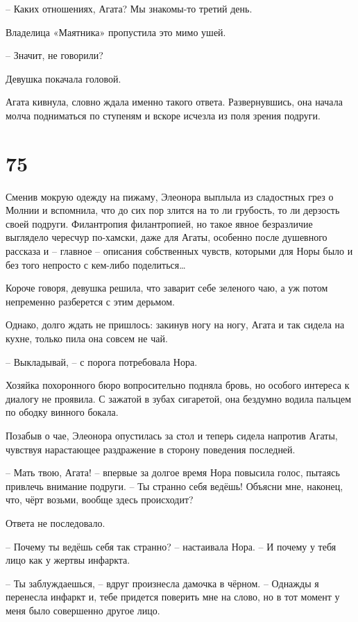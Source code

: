 \documentclass[
  a5paperpaper,
  DIV=11,
  numbers=noendperiod]{scrreprt}
\begin{document}
-- Каких отношениях, Агата? Мы знакомы-то третий день.

Владелица «Маятника» пропустила это мимо ушей.

-- Значит, не говорили?

Девушка покачала головой.

Агата кивнула, словно ждала именно такого ответа. Развернувшись, она
начала молча подниматься по ступеням и вскоре исчезла из поля зрения
подруги.

\section*{75}\label{75}


Сменив мокрую одежду на пижаму, Элеонора выплыла из сладостных грез о
Молнии и вспомнила, что до сих пор злится на то ли грубость, то ли
дерзость своей подруги. Филантропия филантропией, но такое явное
безразличие выглядело чересчур по-хамски, даже для Агаты, особенно после
душевного рассказа и -- главное -- описания собственных чувств, которыми
для Норы было и без того непросто с кем-либо поделиться\ldots{}

Короче говоря, девушка решила, что заварит себе зеленого чаю, а уж потом
непременно разберется с этим дерьмом.

Однако, долго ждать не пришлось: закинув ногу на ногу, Агата и так
сидела на кухне, только пила она совсем не чай.

-- Выкладывай, -- с порога потребовала Нора.

Хозяйка похоронного бюро вопросительно подняла бровь, но особого
интереса к диалогу не проявила. С зажатой в зубах сигаретой, она
бездумно водила пальцем по ободку винного бокала.

Позабыв о чае, Элеонора опустилась за стол и теперь сидела напротив
Агаты, чувствуя нарастающее раздражение в сторону поведения последней.

-- Мать твою, Агата! -- впервые за долгое время Нора повысила голос,
пытаясь привлечь внимание подруги. -- Ты странно себя ведёшь! Объясни
мне, наконец, что, чёрт возьми, вообще здесь происходит?

Ответа не последовало.

-- Почему ты ведёшь себя так странно? -- настаивала Нора. -- И почему у
тебя лицо как у жертвы инфаркта.

-- Ты заблуждаешься, -- вдруг произнесла дамочка в чёрном. -- Однажды я
перенесла инфаркт и, тебе придется поверить мне на слово, но в тот
момент у меня было совершенно другое лицо.
\end{document}
